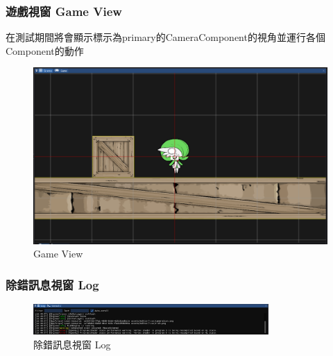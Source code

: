 \subsubsection{遊戲視窗 Game View}

在測試期間將會顯示標示為primary的CameraComponent的視角並運行各個Component的動作

\begin{figure}[h]
    \begin{center}
    \includegraphics[width=0.8\linewidth]{./resources/editor/sceneView.png}
    \end{center}
\caption{Game View}
\label{gameView}
\end{figure}



\newpage
\subsubsection{除錯訊息視窗 Log}

\begin{figure}[h]
    \begin{center}
    \includegraphics[width=0.8\textwidth]{./resources/editor/logger.png}
    \end{center}
\caption{除錯訊息視窗 Log}
\end{figure}

